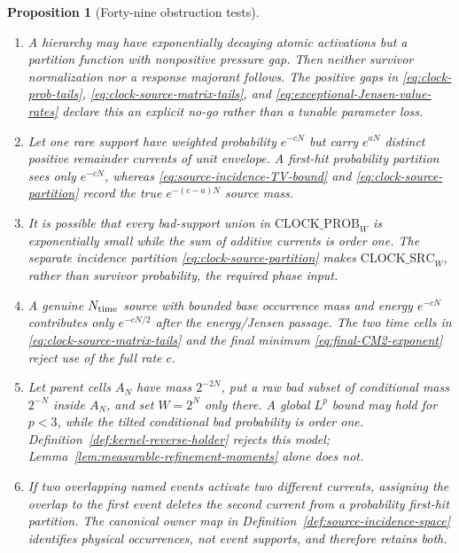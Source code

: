 \documentclass[11pt]{article}
\newtheorem{proposition}[theorem]{Proposition}
\begin{document}
\begin{proposition}[Forty-nine obstruction tests]
\begin{enumerate}[label=\textup{(T\arabic*)}]
      \eqref{eq:upper-scale-excess-tail} prevents the upper-scale ledger from
      evaluating a nonexistent random variable; cemetery mass is charged by
      $\mathrm{CEM\_DOM}$ and $\mathrm{CLOCK\_PROB}_{W}$.
\item A hierarchy may have exponentially decaying atomic activations but a
      partition function with nonpositive pressure gap.  Then neither
      survivor normalization nor a response majorant follows.  The positive
      gaps in \eqref{eq:clock-prob-tails},
      \eqref{eq:clock-source-matrix-tails}, and
      \eqref{eq:exceptional-Jensen-value-rates} declare this an explicit
      no-go rather than a tunable parameter loss.
\item Let one rare support have weighted probability $e^{-cN}$ but carry
      $e^{aN}$ distinct positive remainder currents of unit envelope.  A
      first-hit probability partition sees only $e^{-cN}$, whereas
      \eqref{eq:source-incidence-TV-bound} and
      \eqref{eq:clock-source-partition} record the true
      $e^{-(c-a)N}$ source mass.
\item It is possible that every bad-support union in
      $\mathrm{CLOCK\_PROB}_{W}$ is exponentially small while the sum of
      additive currents is order one.  The separate incidence partition
      \eqref{eq:clock-source-partition} makes
      $\mathrm{CLOCK\_SRC}_{W}$, rather than survivor probability, the
      required phase input.
\item A genuine $N_{\rm time}$ source with bounded base occurrence mass and
      energy $e^{-cN}$ contributes only $e^{-cN/2}$ after the
      energy/Jensen passage.  The two time
      cells in \eqref{eq:clock-source-matrix-tails} and the final minimum
      \eqref{eq:final-CM2-exponent} reject use of the full rate $c$.
\item Let parent cells $A_N$ have mass $2^{-2N}$, put a raw bad subset of
      conditional mass $2^{-N}$ inside $A_N$, and set $W=2^N$ only there.
      A global $L^p$ bound may hold for $p<3$, while the tilted conditional
      bad probability is order one.  Definition~\ref{def:kernel-reverse-holder}
      rejects this model; Lemma~\ref{lem:measurable-refinement-moments} alone
      does not.
\item If two overlapping named events activate two different currents,
      assigning the overlap to the first event deletes the second current
      from a probability first-hit partition.  The canonical owner map in
      Definition~\ref{def:source-incidence-space} identifies physical
      occurrences, not event supports, and therefore retains both.

\end{enumerate}
\end{proposition}
\end{document}
